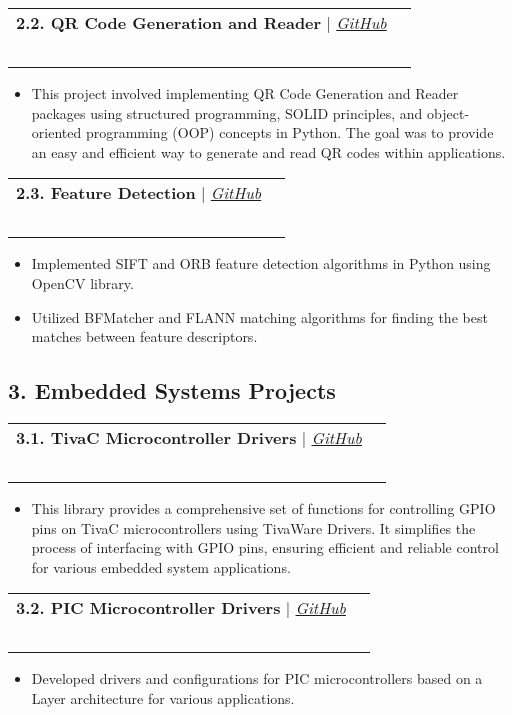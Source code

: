 \documentclass[letterpaper,11pt]{article}
\makeatletter
\newcommand{\resumeItem}[1]{
  \item\small{
    {#1 \vspace{-2pt}}
  }
}
\newcommand{\resumeProjectHeading}[2]{
    \vspace{-3pt}\item
    \begin{tabular*}{0.97\textwidth}{l@{\extracolsep{\fill}}r}
      \small#1 & \\ \ #2 
    \end{tabular*}\vspace{-8pt}
}
\newcommand{\resumeItemListStart}{\begin{itemize}}
\newcommand{\resumeItemListEnd}{\end{itemize}\vspace{-5pt}}
\makeatother
\begin{document}
    \resumeProjectHeading
    {\textbf{2.2. QR Code Generation and Reader} $|$ \emph{\href{https://github.com/HtmMhmd/QR-code-Generation-and-Reader}{\color{blue}GitHub}}}{}
    \resumeItemListStart
    \hfill\small\textbf{Python, qrcode, qreader, OpenCV, OOP, SOLID,Structured programming, Git/Github}
      \resumeItem{This project involved implementing QR Code Generation and Reader packages using structured programming, SOLID principles, and object-oriented programming (OOP) concepts in Python. The goal was to provide an easy and efficient way to generate and read QR codes within applications.}
    \resumeItemListEnd

    \resumeProjectHeading
    {\textbf{2.3. Feature Detection} $|$ \emph{\href{https://github.com/your-username/sift-orb-feature-detection}{\color{blue}GitHub}}}{}
    \resumeItemListStart
    \hfill\small\textbf{Python, OpenCV, OOP, SOLID, Structured programming, Git/Github}
      \resumeItem{Implemented SIFT and ORB feature detection algorithms in Python using OpenCV library.}
      \resumeItem{Utilized BFMatcher and FLANN matching algorithms for finding the best matches between feature descriptors.}
      \resumeItemListEnd
    
  \subsection*{3. Embedded Systems Projects}
   \vspace{1pt}
  \resumeProjectHeading
  {\textbf{3.1. TivaC Microcontroller Drivers} $|$ \emph{\href{https://github.com/HtmMhmd/TivaC-microcontroller-drivers}{\color{blue}GitHub}}}{}
    \resumeItemListStart
      \hfill\small\textbf{C, TivaWare, Structured programming, Git/Github}
      \resumeItem{This library provides a comprehensive set of functions for controlling GPIO pins on TivaC microcontrollers using TivaWare Drivers. It simplifies the process of interfacing with GPIO pins, ensuring efficient and reliable control for various embedded system applications.}
    \resumeItemListEnd

    \resumeProjectHeading
    {\textbf{3.2. PIC Microcontroller Drivers} $|$ \emph{\href{https://github.com/HtmMhmd/TivaC-microcontroller-drivers}{\color{blue}GitHub}}}{}
    \resumeItemListStart
      \hfill\small\textbf{C, Structured programming, Git/Github}
      \resumeItem{Developed drivers and configurations for PIC microcontrollers based on a Layer architecture for various applications.}
    \resumeItemListEnd
\end{document}
